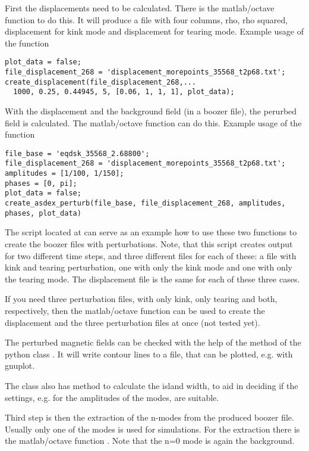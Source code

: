 First the displacements need to be calculated. There is the
matlab/octave function  to do this. It
will produce a file with four columns, rho, rho squared, displacement
for kink mode and displacement for tearing mode. Example usage of the
function
\begin{verbatim}
plot_data = false;
file_displacement_268 = 'displacement_morepoints_35568_t2p68.txt';
create_displacement(file_displacement_268,...
  1000, 0.25, 0.44945, 5, [0.06, 1, 1, 1], plot_data);
\end{verbatim}
With the displacement and the background field (in a boozer file), the
perurbed field is calculated. The matlab/octave function
 can do this. Example usage of the
function
\begin{verbatim}
file_base = 'eqdsk_35568_2.68800';
file_displacement_268 = 'displacement_morepoints_35568_t2p68.txt';
amplitudes = [1/100, 1/150];
phases = [0, pi];
plot_data = false;
create_asdex_perturb(file_base, file_displacement_268, amplitudes, phases, plot_data)
\end{verbatim}

The script 
located at 
can serve as an example how to use these two functions to create the
boozer files with perturbations. Note, that this script creates output
for two different time steps, and three different files for each of
these: a file with kink and tearing perturbation, one with only the kink
mode and one with only the tearing mode. The displacement file is the
same for each of these three cases.

If you need three perturbation files, with only kink, only tearing and
both, respectively, then the matlab/octave function
 can be used to create the
displacement and the three perturbation files at once (not tested yet).

The perturbed magnetic fields can be checked with the help of the
method  of the python class
. It will write contour lines to a file, that can be
plotted, e.g. with gnuplot.

The class also has method  to
calculate the island width, to aid in
deciding if the settings, e.g. for the amplitudes of the modes, are
suitable.

Third step is then the extraction of the n-modes from the produced
boozer file. Usually only one of the modes is used for simulations.
For the extraction there is the matlab/octave function
.
Note that the n=0 mode is again the background.



